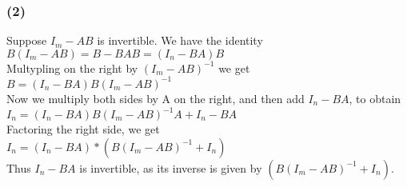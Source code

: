 \documentclass{article}
\begin{document}
\subsubsection{(2)}
Suppose $I_m - AB$ is invertible. We have the identity
\\$B(I_m-AB)=B-BAB=(I_n-BA)B$ 
\\Multypling on the right by $(I_m-AB)^{-1}$ we get
\\$B=(I_n-BA)B(I_m-AB)^{-1}$ 
\\Now we multiply both sides by A on the right, and then add $I_n-BA$, to obtain
\\$I_n=(I_n-BA)B(I_m-AB)^{-1}A+I_n-BA$
\\Factoring the right side, we get
\\$I_n=(I_n-BA)*(B(I_m-AB)^{-1}+I_n)$
\\Thus $I_n-BA$ is invertible, as its inverse is given by $(B(I_m-AB)^{-1}+I_n)$.
\end{document}

